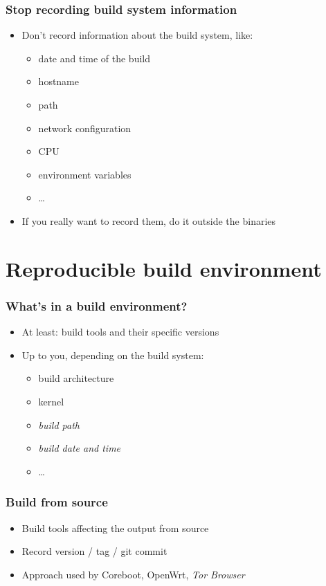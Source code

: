 \documentclass[14pt,aspectratio=169]{beamer}
\begin{document}
\begin{frame}
 \frametitle{Stop recording build system information}

 \begin{itemize}
  \item Don't record information about the build system, like:
   \begin{itemize}
    \item date and time of the build
    \item hostname
    \item path
    \item network configuration
    \item CPU
    \item environment variables
    \item …
   \end{itemize}
  \item<2> If you really want to record them, do it outside the binaries
 \end{itemize}
\end{frame}

\section{Reproducible build environment}

\begin{frame}
 \frametitle{What's in a build environment?}

 \begin{itemize}
  \item At least: build tools and their specific versions
  \item Up to you, depending on the build system:
   \begin{itemize}
    \item build architecture
    \item kernel
    \item \textit{build path}
    \item \textit{build date and time}
    \item …
   \end{itemize}
 \end{itemize}
\end{frame}

\begin{frame}
 \frametitle{Build from source}

 \begin{itemize}
  \item Build tools affecting the output from source
  \item Record version / tag / git commit
  \item Approach used by Coreboot, OpenWrt, \textit{Tor Browser}
 \end{itemize}
\end{frame}
\end{document}
